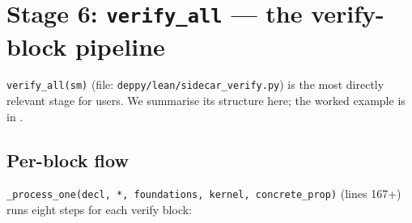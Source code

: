 \section{Stage 6: \texttt{verify\_all} --- the verify-block pipeline}
\label{sec:verify-pipeline}

\texttt{verify\_all(sm)} (file:
\texttt{deppy/lean/sidecar\_verify.py}) is the most directly relevant
stage for \PSDL{} users.  We summarise its structure here; the
worked example is in .

\subsection{Per-block flow}

\texttt{\_process\_one(decl, *, foundations, kernel,
concrete\_prop)} (lines 167+) runs eight steps for each verify
block:

